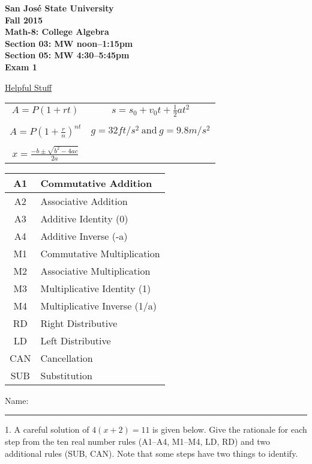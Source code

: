 \documentclass[letterpaper, 12pt]{article}
\begin{document}
\begin{center}
\bfseries
San Jos\'{e} State University \\
Fall 2015 \\
Math-8: College Algebra \\
Section 03: MW noon--1:15pm \\
Section 05: MW 4:30--5:45pm \\
\bigskip
Exam 1
\end{center}

\bigskip

\underline{Helpful Stuff}

\bigskip

\begin{tabular}{cc}
$A=P\left(1+rt\right)$ & $s=s_0+v_0t+\frac{1}{2}at^2$ \\
& \\
$A=P\left(1+\frac{r}{n}\right)^{nt}$ & $g=32 ft/s^2\ \mbox{and}\ g=9.8 m/s^2$ \\
& \\
$x=\frac{-b\pm\sqrt{b^2-4ac}}{2a}$ & \\
\end{tabular}

\bigskip

\begin{tabular}{|c|l|}
\hline
A1 & Commutative Addition \\
\hline
A2 & Associative Addition \\
\hline
A3 & Additive Identity (0) \\
\hline
A4 & Additive Inverse (-a) \\
\hline
M1 & Commutative Multiplication \\
\hline
M2 & Associative Multiplication \\
\hline
M3 & Multiplicative Identity (1) \\
\hline
M4 & Multiplicative Inverse (1/a) \\
\hline
RD & Right Distributive \\
\hline
LD & Left Distributive \\
\hline
CAN & Cancellation \\
\hline
SUB & Substitution \\
\hline
\end{tabular}

\vspace{1in}

Name: \rule{3in}{1pt}

\newpage

1. A careful solution of $4(x+2)=11$ is given below. Give the rationale for
each step from the ten real number rules (A1--A4, M1--M4, LD, RD) and two
additional rules (SUB, CAN).  Note that some steps have two things to identify.
\end{document}
